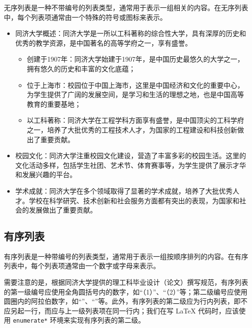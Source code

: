 无序列表是一种不带编号的列表类型，通常用于表示一组相关的内容。在无序列表中，每个列表项通常由一个特殊的符号或图标来表示。

\begin{itemize}
    \item 同济大学概述：同济大学是一所以工科著称的综合性大学，具有深厚的历史和优秀的教学资源，是中国著名的高等学府之一，享有盛誉。
    \begin{itemize}
        \item 创建于1907年：同济大学始建于1907年，是中国历史最悠久的大学之一，拥有悠久的历史和丰富的文化底蕴；
        \item 位于上海市：校园位于中国上海市，这里是中国经济和文化的重要中心，为学生提供了广阔的发展空间，是学习和生活的理想之地，也是中国高等教育的重要基地；
        \item 以工科著称：同济大学在工程学科方面享有盛誉，是中国顶尖的工科学府之一，培养了大批优秀的工程技术人才，为国家的工程建设和科技创新做出了重要贡献。
    \end{itemize}
    \item 校园文化：同济大学注重校园文化建设，营造了丰富多彩的校园生活。这里的文化活动多样，包括学生社团、艺术节、体育赛事等，为学生提供了展示才华和发展兴趣的平台。
    \item 学术成就：同济大学在多个领域取得了显著的学术成就，培养了大批优秀人才。学校在科学研究、技术创新和社会服务方面都有突出的表现，为国家和社会的发展做出了重要贡献。
\end{itemize}

\subsection{有序列表}

有序列表是一种带编号的列表类型，通常用于表示一组按顺序排列的内容。在有序列表中，每个列表项通常由一个数字或字母来表示。

需要注意的是，根据同济大学提供的理工科毕业设计（论文）撰写规范，有序列表的第一级编号应使用全角圆括号内的数字，如“（1）”、“（2）”等；第二级编号应使用圆圈内的阿拉伯数字，如“”、“”等。此外，有序列表的第二级应为行内列表，即不应另起一行，而应与上一级列表项在同一行内；我们在写 \LaTeX{} 代码时，应该使用 \texttt{enumerate*} 环境来实现有序列表的第二级。

